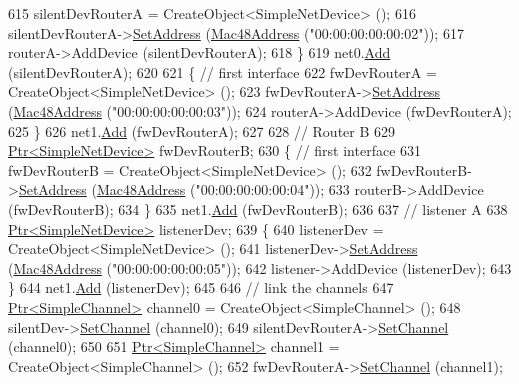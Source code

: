 \begin{DoxyCode}
615     silentDevRouterA = CreateObject<SimpleNetDevice> ();
616     silentDevRouterA->\hyperlink{classns3_1_1SimpleNetDevice_a968ef3e7318bac29d5f1d7d977029af4}{SetAddress} (\hyperlink{classns3_1_1Mac48Address}{Mac48Address} (\textcolor{stringliteral}{"00:00:00:00:00:02"}));
617     routerA->AddDevice (silentDevRouterA);
618   \}
619   net0.\hyperlink{classns3_1_1NetDeviceContainer_a7ca8bc1d7ec00fd4fcc63869987fbda5}{Add} (silentDevRouterA);
620 
621   \{ \textcolor{comment}{// first interface}
622     fwDevRouterA = CreateObject<SimpleNetDevice> ();
623     fwDevRouterA->\hyperlink{classns3_1_1SimpleNetDevice_a968ef3e7318bac29d5f1d7d977029af4}{SetAddress} (\hyperlink{classns3_1_1Mac48Address}{Mac48Address} (\textcolor{stringliteral}{"00:00:00:00:00:03"}));
624     routerA->AddDevice (fwDevRouterA);
625   \}
626   net1.\hyperlink{classns3_1_1NetDeviceContainer_a7ca8bc1d7ec00fd4fcc63869987fbda5}{Add} (fwDevRouterA);
627 
628   \textcolor{comment}{// Router B}
629   \hyperlink{classns3_1_1Ptr}{Ptr<SimpleNetDevice>} fwDevRouterB;
630   \{ \textcolor{comment}{// first interface}
631     fwDevRouterB = CreateObject<SimpleNetDevice> ();
632     fwDevRouterB->\hyperlink{classns3_1_1SimpleNetDevice_a968ef3e7318bac29d5f1d7d977029af4}{SetAddress} (\hyperlink{classns3_1_1Mac48Address}{Mac48Address} (\textcolor{stringliteral}{"00:00:00:00:00:04"}));
633     routerB->AddDevice (fwDevRouterB);
634   \}
635   net1.\hyperlink{classns3_1_1NetDeviceContainer_a7ca8bc1d7ec00fd4fcc63869987fbda5}{Add} (fwDevRouterB);
636 
637   \textcolor{comment}{// listener A}
638   \hyperlink{classns3_1_1Ptr}{Ptr<SimpleNetDevice>} listenerDev;
639   \{
640     listenerDev = CreateObject<SimpleNetDevice> ();
641     listenerDev->\hyperlink{classns3_1_1SimpleNetDevice_a968ef3e7318bac29d5f1d7d977029af4}{SetAddress} (\hyperlink{classns3_1_1Mac48Address}{Mac48Address} (\textcolor{stringliteral}{"00:00:00:00:00:05"}));
642     listener->AddDevice (listenerDev);
643   \}
644   net1.\hyperlink{classns3_1_1NetDeviceContainer_a7ca8bc1d7ec00fd4fcc63869987fbda5}{Add} (listenerDev);
645 
646   \textcolor{comment}{// link the channels}
647   \hyperlink{classns3_1_1Ptr}{Ptr<SimpleChannel>} channel0 = CreateObject<SimpleChannel> ();
648   silentDev->\hyperlink{classns3_1_1SimpleNetDevice_af9e9828ad584b5ba538f18f645f162e0}{SetChannel} (channel0);
649   silentDevRouterA->\hyperlink{classns3_1_1SimpleNetDevice_af9e9828ad584b5ba538f18f645f162e0}{SetChannel} (channel0);
650 
651   \hyperlink{classns3_1_1Ptr}{Ptr<SimpleChannel>} channel1 = CreateObject<SimpleChannel> ();
652   fwDevRouterA->\hyperlink{classns3_1_1SimpleNetDevice_af9e9828ad584b5ba538f18f645f162e0}{SetChannel} (channel1);

\end{DoxyCode}
